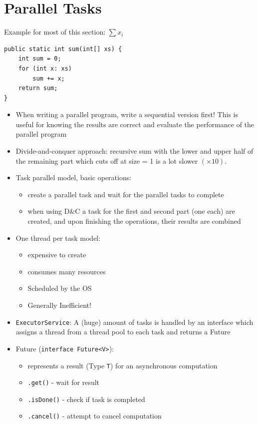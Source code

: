 \documentclass[a4paper]{article}
\newcommand{\inline}[1]{\lstinline!#1!}%
\begin{document}
\section{Parallel Tasks}
Example for most of this section: $\sum x_i$
\begin{lstlisting}
public static int sum(int[] xs) {
	int sum = 0;
	for (int x: xs)
		sum += x;
 	return sum;
}
\end{lstlisting}
\begin{itemize}
\item When writing a parallel program, write a sequential version first! This is useful for knowing the results are correct and evaluate the performance of the parallel program
\item Divide-and-conquer approach: recursive sum with the lower and upper half of the remaining part which cuts off at size = 1 is a lot slower $(\times 10)$. 
\item Task parallel model, basic operations: 
\begin{itemize}
\item create a parallel task and wait for the parallel tasks to complete
\item  when using D\&C a task for the first and second part (one each) are created, and upon finishing the operations, their results are combined
\end{itemize}
\item One thread per task model: 
\begin{itemize}
\item expensive to create
\item consumes many resources 
\item Scheduled by the OS
\item Generally Inefficient!
\end{itemize}
\item \inline{ExecutorService}: A (huge) amount of tasks is handled by an interface which assigns a thread from a thread pool to each task and returns a Future
\item Future (\inline{interface Future<V>}):
\begin{itemize}
\item represents a result (Type \inline{T}) for an asynchronous computation
\item \inline{.get()} - wait for result
\item \inline{.isDone()} - check if task is completed
\item \inline{.cancel()} - attempt to cancel computation
\end{itemize}

\end{itemize}
\end{document}
